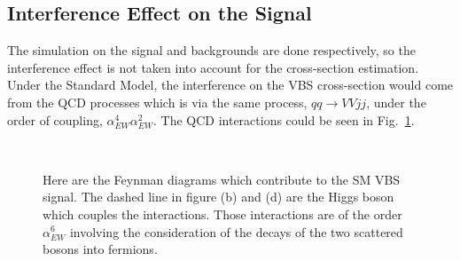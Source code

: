 \subsection{Interference Effect on the Signal}
The simulation on the signal and backgrounds are done respectively, so the interference effect is not taken into account for the cross-section estimation. Under the Standard Model, the interference on the VBS cross-section would come from the QCD processes which is via the same process, $qq\to VVjj$, under the order of coupling, $\alpha_{EW}^4\alpha_{EW}^2$. The QCD interactions could be seen in Fig.~\ref{Fig:feynmanQCD}.
\begin{figure}[tbp]
	\begin{center}
		\\
		\caption{
			Here are the Feynman diagrams which contribute to the SM VBS signal. The dashed line in figure (b) and (d) are the Higgs boson which couples the interactions. Those interactions are of the order $\alpha_{EW}^6$ involving the consideration of the decays of the two scattered bosons into fermions. 
		}
		\label{Fig:feynmanQCD}
	\end{center}
\end{figure}
